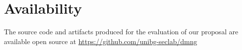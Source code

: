 











\section*{Availability}
The source code and artifacts produced for the evaluation of
our proposal are available open source at
\url{https://github.com/unibg-seclab/dmng}
